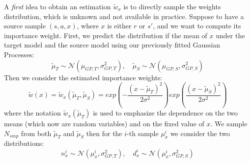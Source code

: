     \noindent A \textit{first} idea to obtain an estimation $\tilde{w}_{x}$ is to directly sample the weights distribution, which
    is unknown and not available in practice.\newline
    Suppose to have a source sample $(s,a,x)$, where $x$ is either $r$ or $s'$, and we want to compute
    its importance weight. First, we predict the distribution if the mean of $x$ under the target model and the
    source model using our previously fitted Gaussian Processes:
    \begin{equation}
      \tilde{\mu}_{T} \sim \mathcal{N}(\mu_{GP,T}, \sigma_{GP,T}^{2}), \quad \tilde{\mu}_{S} \sim \mathcal{N}(\mu_{GP,S}, \sigma_{GP,S}^{2})
      \label{distributions}
    \end{equation}
    Then we consider the estimated importance weights:
    \begin{equation}
      \tilde{w}(x) = \tilde{w}_{x}(\tilde{\mu}_{T}, \tilde{\mu}_{S}) = exp \left ( -\frac{(x-\tilde{\mu}_{T})^{2}}{2\sigma^{2}} \right ) exp \left ( \frac{(x-\tilde{\mu}_{S})^{2}}{2\sigma^{2}} \right )
    \end{equation}
    where the notation $\tilde{w}_{x}(\tilde{\mu}_{T})$ is used to emphasize the dependence on the two means (which now
    are random variables) and on the fixed value of $x$.\newline
    We sample $N_{smp}$ from both $\tilde{\mu}_{T}$ and $\tilde{\mu}_{S}$ then for the $i$-th sample $\mu_{x}^{i}$ we consider the
    two distributions:
    \begin{equation}
      n_{x}^{i} \sim \mathcal{N}(\mu_{x}^{i}, \sigma^{2}_{GP,T}), \quad d_{x}^{i} \sim \mathcal{N}(\mu_{x}^{i},\sigma^{2}_{GP,S})
    \end{equation}

